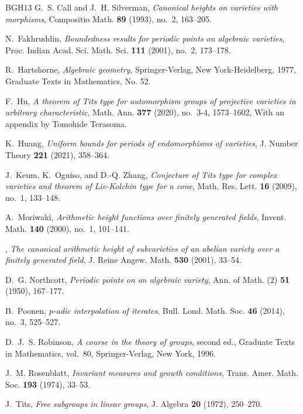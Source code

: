 \documentclass{amsart}
\theoremstyle{definition}
\begin{document}
\begin{thebibliography}{BGH{\etalchar{+}}13}
G.~S. Call and J.~H. Silverman, \emph{Canonical heights on varieties with
  morphisms}, Compositio Math. \textbf{89} (1993), no.~2, 163--205.

N.~Fakhruddin, \emph{Boundedness results for periodic points on algebraic
  varieties}, Proc. Indian Acad. Sci. Math. Sci. \textbf{111} (2001), no.~2,
  173--178.

R.~Hartshorne, \emph{Algebraic geometry}, Springer-Verlag, New York-Heidelberg,
  1977, Graduate Texts in Mathematics, No. 52.

F.~Hu, \emph{A theorem of {T}its type for automorphism groups of projective
  varieties in arbitrary characteristic}, Math. Ann. \textbf{377} (2020),
  no.~3-4, 1573--1602, With an appendix by Tomohide Terasoma.

K.~Huang, \emph{Uniform bounds for periods of endomorphisms of varieties}, J.
  Number Theory \textbf{221} (2021), 358--364.

J.~Keum, K.~Oguiso, and D.-Q. Zhang, \emph{Conjecture of {T}its type for
  complex varieties and theorem of {L}ie-{K}olchin type for a cone}, Math. Res.
  Lett. \textbf{16} (2009), no.~1, 133--148.

A.~Moriwaki, \emph{Arithmetic height functions over finitely generated fields},
  Invent. Math. \textbf{140} (2000), no.~1, 101--141.

\bysame, \emph{The canonical arithmetic height of subvarieties of an abelian
  variety over a finitely generated field}, J. Reine Angew. Math. \textbf{530}
  (2001), 33--54.

D.~G. Northcott, \emph{Periodic points on an algebraic variety}, Ann. of Math.
  (2) \textbf{51} (1950), 167--177.

B.~Poonen, \emph{{$p$}-adic interpolation of iterates}, Bull. Lond. Math. Soc.
  \textbf{46} (2014), no.~3, 525--527.

D.~J.~S. Robinson, \emph{A course in the theory of groups}, second ed.,
  Graduate Texts in Mathematics, vol.~80, Springer-Verlag, New York, 1996.

J.~M. Rosenblatt, \emph{Invariant measures and growth conditions}, Trans. Amer.
  Math. Soc. \textbf{193} (1974), 33--53.

J.~Tits, \emph{Free subgroups in linear groups}, J. Algebra \textbf{20} (1972),
  250--270.


\end{thebibliography}
\end{document}
